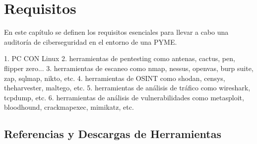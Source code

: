 \documentclass[a4paper, 10pt]{article}
\begin{document}
\clearpage

\section{Requisitos}
En este capítulo se definen los requisitos esenciales para llevar a cabo una auditoría de ciberseguridad en el entorno de una PYME.

1. PC CON Linux
2. herramientas de pentesting como antenas, cactus, pen, flipper zero... 
3. herramientas de escaneo como nmap, nessus, openvas, burp suite, zap, sqlmap, nikto, etc.
4. herramientas de OSINT como shodan, censys, theharvester, maltego, etc.
5. herramientas de análisis de tráfico como wireshark, tcpdump, etc.
6. herramientas de análisis de vulnerabilidades como metasploit, bloodhound, crackmapexec, mimikatz, etc.


\subsection{Referencias y Descargas de Herramientas}
\end{document}
